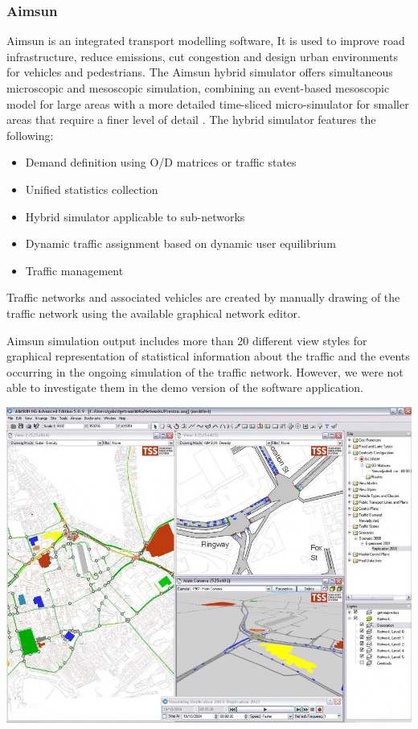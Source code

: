 \subsubsection{Aimsun}
	Aimsun is an integrated transport modelling software, It is used to improve road infrastructure, reduce emissions, cut congestion and design urban environments for vehicles and pedestrians. The Aimsun hybrid simulator offers simultaneous microscopic and mesoscopic simulation, combining an event-based mesoscopic model for large areas with a more detailed time-sliced micro-simulator for smaller areas that require a finer level of detail \cite{EM2}.
The hybrid simulator features the following:
	\begin{itemize}
		\item Demand definition using O/D matrices or traffic states
		\item Unified statistics collection
		\item Hybrid simulator applicable to sub-networks
		\item Dynamic traffic assignment based on dynamic user equilibrium
		\item Traffic management
	\end{itemize}
	
	Traffic networks and associated vehicles are created by manually drawing of the traffic network using the available graphical network editor.
	
	Aimsun simulation output includes more than 20 different view styles for graphical representation of statistical information about the traffic and the events occurring in the ongoing simulation of the traffic network. However, we were not able to investigate them in the demo version of the software application.
	
	\begin{center}
	\includegraphics[scale=0.3]{./images/aimsun.png}
	\end{center}
	

